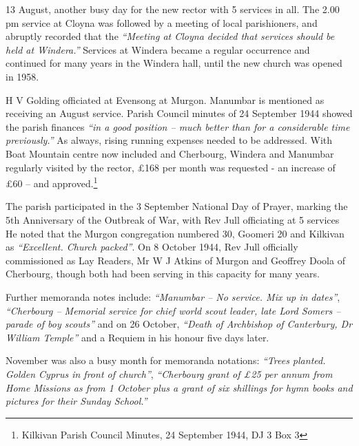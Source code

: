 13 August, another busy day for the new rector with 5 services in all. The 2.00 pm service at Cloyna was followed by a meeting of local parishioners, and abruptly recorded that the \emph{``Meeting at Cloyna decided that services should be held at Windera.''} Services at Windera became a regular occurrence and continued for many years in the Windera hall, until the new church was opened in 1958.



H V Golding officiated at Evensong at Murgon. Manumbar is mentioned as receiving an August service. Parish Council minutes of 24 September 1944 showed the parish finances \emph{``in a good position -- much better than for a considerable time previously.''} As always, rising running expenses needed to be addressed. With Boat Mountain centre now included and Cherbourg, Windera and Manumbar regularly visited by the rector, \pounds168 per month was requested - an increase of \pounds60 -- and approved.\footnote{Kilkivan Parish Council Minutes, 24 September 1944, DJ 3 Box 3}


The parish participated in the 3 September National Day of Prayer, marking the 5th Anniversary of the Outbreak of War, with Rev Jull officiating at 5 services He noted that the Murgon congregation numbered 30, Goomeri 20 and Kilkivan as \emph{``Excellent. Church packed''}. On 8 October 1944, Rev Jull officially commissioned as Lay Readers, Mr W J Atkins of Murgon and Geoffrey Doola of Cherbourg, though both had been serving in this capacity for many years.



Further memoranda notes include: \emph{``Manumbar -- No service. Mix up in dates''}, \emph{``Cherbourg -- Memorial service for chief world scout leader, late Lord Somers -- parade of boy scouts''} and on 26 October, \emph{``Death of Archbishop of Canterbury, Dr William Temple''} and a Requiem in his honour five days later.



November was also a busy month for memoranda notations: \emph{``Trees planted. Golden Cyprus in front of church''}, \emph{``Cherbourg grant of \pounds25 per annum from Home Missions as from 1 October plus a grant of six shillings for hymn books and pictures for their Sunday School.''}



